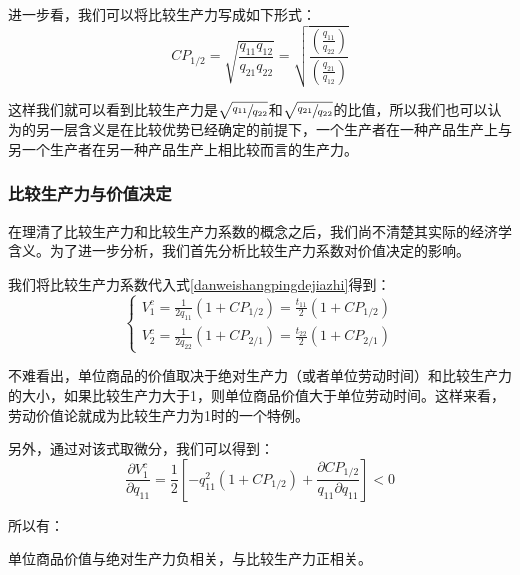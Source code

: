 进一步看，我们可以将比较生产力写成如下形式：
\begin{equation}
    \mathit{CP}_{1/2} = \sqrt{\frac{q_{11}q_{12}}{q_{21}q_{22}}} = \sqrt{\frac{\left(\frac{q_{11}}{q_{22}}\right)}{\left(\frac{q_{21}}{q_{12}}\right)}} 
\end{equation}

这样我们就可以看到比较生产力是$ \sqrt{\sfrac{q_{11}}{q_{22}}} $和$\sqrt{\sfrac{q_{21}}{q_{22}}}$的比值，所以我们也可以认为的另一层含义是在比较优势已经确定的前提下，一个生产者在一种产品生产上与另一个生产者在另一种产品生产上相比较而言的生产力。

\subsubsection{比较生产力与价值决定}

在理清了比较生产力和比较生产力系数的概念之后，我们尚不清楚其实际的经济学含义。为了进一步分析，我们首先分析比较生产力系数对价值决定的影响。

我们将比较生产力系数代入式\ref{danweishangpingdejiazhi}得到：
\begin{equation}
    \begin{cases}
        V_1^c = \frac{1}{2q_{11}} \left( 1 + \mathit{CP}_{1/2} \right) = \frac{t_{11}}{2} \left( 1 + \mathit{CP}_{1/2} \right) \\
        V_2^c = \frac{1}{2q_{22}} \left( 1 + \mathit{CP}_{2/1} \right) = \frac{t_{22}}{2} \left( 1 + \mathit{CP}_{2/1} \right)
    \end{cases}
\end{equation}

不难看出，单位商品的价值取决于绝对生产力（或者单位劳动时间）和比较生产力的大小，如果比较生产力大于1，则单位商品价值大于单位劳动时间。这样来看，劳动价值论就成为比较生产力为1时的一个特例\cite[72]{CaiJiMingCongXiaYiJieZhiLunDaoGuangYiJieZhiLunXiuDingBan2022}。

另外，通过对该式取微分，我们可以得到\cite[93]{CaiJiMingCongXiaYiJieZhiLunDaoGuangYiJieZhiLunXiuDingBan2022}：
\begin{equation}
    \frac{\partial V_1^c}{\partial q_{11}} = \frac{1}{2} \left[ -q_{11}^2 \left( 1 + \mathit{CP}_{1/2} \right) + \frac{\partial \mathit{CP}_{1/2}}{q_{11}\partial q_{11}} \right] < 0
\end{equation}

所以有：

\begin{theorem}
    单位商品价值与绝对生产力负相关，与比较生产力正相关\cite[92]{CaiJiMingCongXiaYiJieZhiLunDaoGuangYiJieZhiLunXiuDingBan2022}。
\end{theorem}

